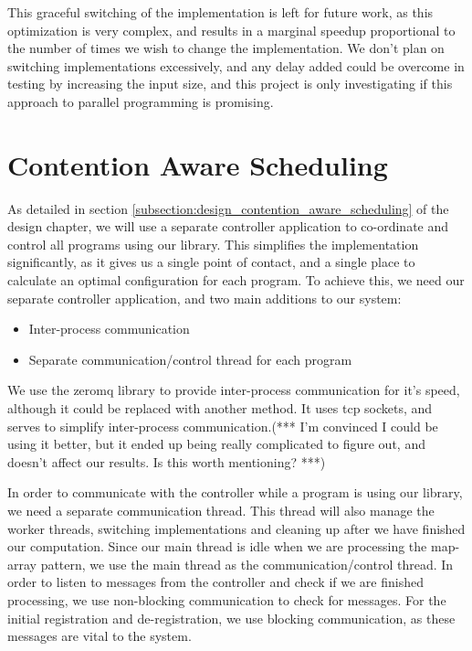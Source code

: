 This graceful switching of the implementation is left for future work, as this optimization is very complex, and results in a marginal speedup proportional to the number of times we wish to change the implementation. We don't plan on switching implementations excessively, and any delay added could be overcome in testing by increasing the input size, and this project is only investigating if this approach to parallel programming is promising.



\section{Contention Aware Scheduling}

As detailed in section \ref{subsection:design_contention_aware_scheduling} of the design chapter, we will use a separate controller application to co-ordinate and control all programs using our library. This simplifies the implementation significantly, as it gives us a single point of contact, and a single place to calculate an optimal configuration for each program. To achieve this, we need our separate controller application, and two main additions to our system:

\begin{itemize}
	\item Inter-process communication
	\item Separate communication/control thread for each program
\end{itemize}

We use the zeromq library to provide inter-process communication for it's speed, although it could be replaced with another method. It uses tcp sockets, and serves to simplify inter-process communication.(*** I'm convinced I could be using it better, but it ended up being really complicated to figure out, and doesn't affect our results. Is this worth mentioning? ***)

In order to communicate with the controller while a program is using our library, we need a separate communication thread. This thread will also manage the worker threads, switching implementations and cleaning up after we have finished our computation. Since our main thread is idle when we are processing the map-array pattern, we use the main thread as the communication/control thread. In order to listen to messages from the controller and check if we are finished processing, we use non-blocking communication to check for messages. For the initial registration and de-registration, we use blocking communication, as these messages are vital to the system.



